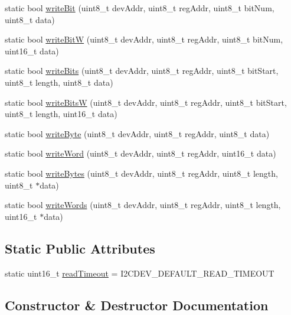 \begin{DoxyCompactItemize}
\item 
static bool \hyperlink{class_i2_cdev_aa68890af87de5471d32e583ebbd91acb}{write\+Bit} (uint8\+\_\+t dev\+Addr, uint8\+\_\+t reg\+Addr, uint8\+\_\+t bit\+Num, uint8\+\_\+t data)
\item 
static bool \hyperlink{class_i2_cdev_a1b5fbedfadec5d429c81ee84d27e658d}{write\+Bit\+W} (uint8\+\_\+t dev\+Addr, uint8\+\_\+t reg\+Addr, uint8\+\_\+t bit\+Num, uint16\+\_\+t data)
\item 
static bool \hyperlink{class_i2_cdev_a913371251b6a41520c080115650e1b59}{write\+Bits} (uint8\+\_\+t dev\+Addr, uint8\+\_\+t reg\+Addr, uint8\+\_\+t bit\+Start, uint8\+\_\+t length, uint8\+\_\+t data)
\item 
static bool \hyperlink{class_i2_cdev_a8f8652a1328224cce867eed665a45c4d}{write\+Bits\+W} (uint8\+\_\+t dev\+Addr, uint8\+\_\+t reg\+Addr, uint8\+\_\+t bit\+Start, uint8\+\_\+t length, uint16\+\_\+t data)
\item 
static bool \hyperlink{class_i2_cdev_aeb297637ef985cd562da465ba61b7042}{write\+Byte} (uint8\+\_\+t dev\+Addr, uint8\+\_\+t reg\+Addr, uint8\+\_\+t data)
\item 
static bool \hyperlink{class_i2_cdev_acbe68a802d6a177301736e60bedd1def}{write\+Word} (uint8\+\_\+t dev\+Addr, uint8\+\_\+t reg\+Addr, uint16\+\_\+t data)
\item 
static bool \hyperlink{class_i2_cdev_aa4e39cac6c0eac5112f9132084bcc93e}{write\+Bytes} (uint8\+\_\+t dev\+Addr, uint8\+\_\+t reg\+Addr, uint8\+\_\+t length, uint8\+\_\+t $\ast$data)
\item 
static bool \hyperlink{class_i2_cdev_aae37c0526e4b4730a5b2ffd752fd8b21}{write\+Words} (uint8\+\_\+t dev\+Addr, uint8\+\_\+t reg\+Addr, uint8\+\_\+t length, uint16\+\_\+t $\ast$data)
\end{DoxyCompactItemize}
\subsection*{Static Public Attributes}
\begin{DoxyCompactItemize}
\item 
static uint16\+\_\+t \hyperlink{class_i2_cdev_ae2125796e0948127fc15031650111e82}{read\+Timeout} = I2\+C\+D\+E\+V\+\_\+\+D\+E\+F\+A\+U\+L\+T\+\_\+\+R\+E\+A\+D\+\_\+\+T\+I\+M\+E\+O\+U\+T
\end{DoxyCompactItemize}


\subsection{Constructor \& Destructor Documentation}
\hypertarget{class_i2_cdev_a0a466e2323d9f719a1ecc9fa11ac5c84}{}
